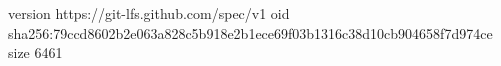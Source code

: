 version https://git-lfs.github.com/spec/v1
oid sha256:79ccd8602b2e063a828c5b918e2b1ece69f03b1316c38d10cb904658f7d974ce
size 6461
